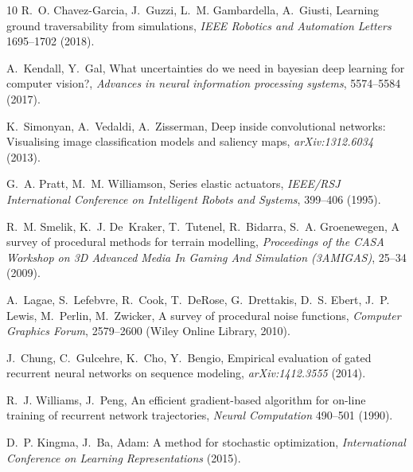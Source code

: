 \documentclass[9pt,twocolumn,twoside]{osajnl}
\begin{document}
\begin{thebibliography}{10}
R.~O. Chavez-Garcia, J.~Guzzi, L.~M. Gambardella, A.~Giusti, Learning ground
  traversability from simulations, {\it IEEE Robotics and Automation Letters\/}
   1695--1702 (2018).

A.~Kendall, Y.~Gal, What uncertainties do we need in bayesian deep learning for
  computer vision?, {\it Advances in neural information processing systems\/},
  5574--5584 (2017).

K.~Simonyan, A.~Vedaldi, A.~Zisserman, Deep inside convolutional networks:
  Visualising image classification models and saliency maps, {\it
  arXiv:1312.6034\/}  (2013).

G.~A. Pratt, M.~M. Williamson, Series elastic actuators, {\it IEEE/RSJ
  International Conference on Intelligent Robots and Systems\/},  399--406
  (1995).

R.~M. Smelik, K.~J. De~Kraker, T.~Tutenel, R.~Bidarra, S.~A. Groenewegen, A
  survey of procedural methods for terrain modelling, {\it Proceedings of the
  CASA Workshop on 3D Advanced Media In Gaming And Simulation (3AMIGAS)\/},
  25--34 (2009).

A.~Lagae, S.~Lefebvre, R.~Cook, T.~DeRose, G.~Drettakis, D.~S. Ebert, J.~P.
  Lewis, M.~Perlin, M.~Zwicker, A survey of procedural noise functions, {\it
  Computer Graphics Forum\/},  2579--2600 (Wiley Online Library, 2010).

J.~Chung, C.~Gulcehre, K.~Cho, Y.~Bengio, Empirical evaluation of gated
  recurrent neural networks on sequence modeling, {\it arXiv:1412.3555\/}
  (2014).

R.~J. Williams, J.~Peng, An efficient gradient-based algorithm for on-line
  training of recurrent network trajectories, {\it Neural Computation\/}
  490--501 (1990).

D.~P. Kingma, J.~Ba, Adam: A method for stochastic optimization, {\it
  International Conference on Learning Representations\/} (2015).

\end{thebibliography}


\clearpage
\newpage

\setcounter{table}{0}
\makeatletter
\renewcommand{\thetable}{S\@arabic\c@table}
\makeatother

\setcounter{figure}{0}
\makeatletter
\renewcommand{\thefigure}{S\@arabic\c@figure}
\makeatother
\end{document}
